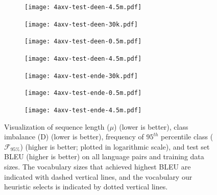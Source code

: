 \begin{figure}[!ht]
\begin{subfigure}{\textwidth}
  \centering
  \texttt{[image: 4axv-test-deen-4.5m.pdf]}
\end{subfigure}

\begin{subfigure}{.48\textwidth}
  \centering
  \texttt{[image: 4axv-test-deen-30k.pdf]}
\end{subfigure}
\begin{subfigure}{.48\textwidth}
  \centering
  \texttt{[image: 4axv-test-deen-0.5m.pdf]}
\end{subfigure}

\begin{subfigure}{.48\textwidth}
  \centering
  \texttt{[image: 4axv-test-deen-4.5m.pdf]}
\end{subfigure}
\begin{subfigure}{.48\textwidth}
  \centering
  \texttt{[image: 4axv-test-ende-30k.pdf]}
\end{subfigure}

\begin{subfigure}{.48\textwidth}
  \centering
  \texttt{[image: 4axv-test-ende-0.5m.pdf]}
\end{subfigure}
\begin{subfigure}{.48\textwidth}
  \centering
  \texttt{[image: 4axv-test-ende-4.5m.pdf]}
\end{subfigure}

\caption{Visualization of sequence length ($\mu$) (lower is better), class imbalance (D) (lower is better), frequency of $95^{th}$ percentile class ($\mathcal{F}_{95\%}$) (higher is better; plotted in logarithmic scale), and test set BLEU (higher is better) on all language pairs and training data sizes. %
The vocabulary sizes that achieved highest BLEU are indicated with dashed vertical lines, and the vocabulary our heuristic selects is indicated by dotted vertical lines.}
\label{fig:mu-d-freq-bleu-part1}
\end{figure}

